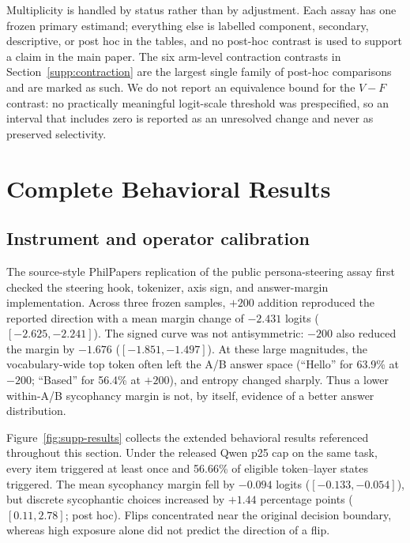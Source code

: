 \documentclass[letterpaper]{article}
\begin{document}
Multiplicity is handled by status rather than by adjustment. Each assay has one frozen primary estimand; everything else is labelled component, secondary, descriptive, or post hoc in the tables, and no post-hoc contrast is used to support a claim in the main paper. The six arm-level contraction contrasts in Section~\ref{supp:contraction} are the largest single family of post-hoc comparisons and are marked as such. We do not report an equivalence bound for the $V-F$ contrast: no practically meaningful logit-scale threshold was prespecified, so an interval that includes zero is reported as an unresolved change and never as preserved selectivity.

\section{Complete Behavioral Results}
\label{supp:behavior}

\subsection{Instrument and operator calibration}

The source-style PhilPapers replication of the public persona-steering assay \citep{kelkar2026devil} first checked the steering hook, tokenizer, axis sign, and answer-margin implementation.  Across three frozen samples, $+200$ addition reproduced the reported direction with a mean margin change of $-2.431$ logits ($[-2.625,-2.241]$).  The signed curve was not antisymmetric: $-200$ also reduced the margin by $-1.676$ ($[-1.851,-1.497]$).  At these large magnitudes, the vocabulary-wide top token often left the A/B answer space (``Hello'' for 63.9\% at $-200$; ``Based'' for 56.4\% at $+200$), and entropy changed sharply.  Thus a lower within-A/B sycophancy margin is not, by itself, evidence of a better answer distribution.

Figure~\ref{fig:supp-results} collects the extended behavioral results referenced throughout this section. Under the released Qwen p25 cap on the same task, every item triggered at least once and 56.66\% of eligible token--layer states triggered.  The mean sycophancy margin fell by $-0.094$ logits ($[-0.133,-0.054]$), but discrete sycophantic choices increased by $+1.44$ percentage points ($[0.11,2.78]$; post hoc).  Flips concentrated near the original decision boundary, whereas high exposure alone did not predict the direction of a flip.
\end{document}
